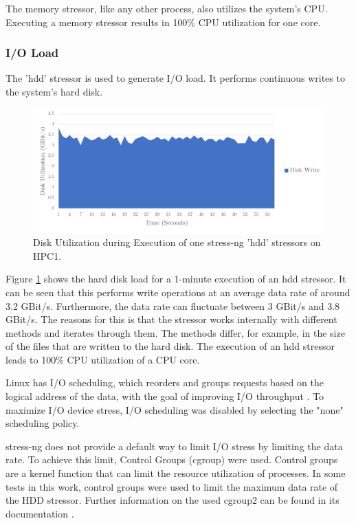 The memory stressor, like any other process, also utilizes the system's CPU. Executing a memory stressor results in 100\% CPU utilization for one core.

\subsubsection{I/O Load} \label{chap:stressngIO}
The 'hdd' stressor is used to generate I/O load. It performs continuous writes to the system's hard disk.

\begin{figure}[h!]
    \centering
    \includegraphics[width=1\linewidth]{figures/method/stress4.pdf}
    \caption{Disk Utilization during Execution of one stress-ng 'hdd' stressors on HPC1.}
    \label{fig:stressIO}
\end{figure}

Figure \ref{fig:stressIO} shows the hard disk load for a 1-minute execution of an hdd stressor. It can be seen that this performs write operations at an average data rate of around 3.2 GBit/s. Furthermore, the data rate can fluctuate between 3 GBit/s and 3.8 GBit/s. The reasons for this is that the stressor works internally with different methods and iterates through them. The methods differ, for example, in the size of the files that are written to the hard disk. The execution of an hdd stressor leads to 100\% CPU utilization of a CPU core.

Linux has I/O scheduling, which reorders and groups requests based on the logical address of the data, with the goal of improving I/O throughput \cite{stress10}. To maximize I/O device stress, I/O scheduling was disabled by selecting the "none" scheduling policy.

stress-ng does not provide a default way to limit I/O stress by limiting the data rate. To achieve this limit, Control Groups (cgroup) were used. Control groups are a kernel function that can limit the resource utilization of processes. In some tests in this work, control groups were used to limit the maximum data rate of the HDD stressor. Further information on the used cgroup2 can be found in its documentation \cite{stress11}.


